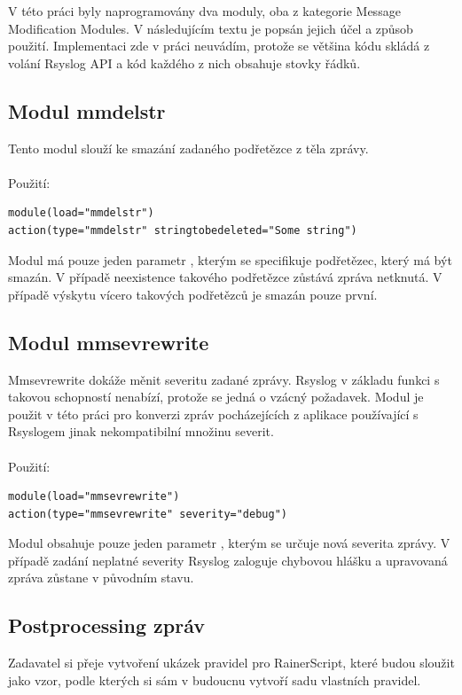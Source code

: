 \documentclass[thesis=B,czech]{FITthesis}[2012/06/26]
\begin{document}
V této práci byly naprogramovány dva moduly, oba z kategorie Message Modification Modules. V následujícím textu je popsán jejich účel a způsob použití. Implementaci zde v práci neuvádím, protože se většina kódu skládá z volání Rsyslog API a kód každého z nich obsahuje stovky řádků.

\subsection{Modul mmdelstr}
Tento modul slouží ke smazání zadaného podřetězce z těla zprávy.
\\
\\
Použití:
\begin{lstlisting}[style=RainerScriptSimpleStyle]
module(load="mmdelstr") 
action(type="mmdelstr" stringtobedeleted="Some string")
\end{lstlisting}

Modul má pouze jeden parametr , kterým se specifikuje podřetězec, který má být smazán. V případě neexistence takového podřetězce zůstává zpráva netknutá. V případě výskytu vícero takových podřetězců je smazán pouze první.

\subsection{Modul mmsevrewrite}
Mmsevrewrite dokáže měnit severitu zadané zprávy. Rsyslog v základu funkci s takovou schopností nenabízí, protože se jedná o vzácný požadavek. Modul je použit v této práci pro konverzi zpráv pocházejících z aplikace používající s Rsyslogem jinak nekompatibilní množinu severit.
\\
\\
Použití:
\begin{lstlisting}[style=RainerScriptSimpleStyle]
module(load="mmsevrewrite")
action(type="mmsevrewrite" severity="debug")
\end{lstlisting}

Modul obsahuje pouze jeden parametr , kterým se určuje nová severita zprávy. V případě zadání neplatné severity Rsyslog zaloguje chybovou hlášku a upravovaná zpráva zůstane v původním stavu.

\subsection{Postprocessing zpráv}
Zadavatel si přeje vytvoření ukázek pravidel pro RainerScript, které budou sloužit jako vzor, podle kterých si sám v budoucnu vytvoří sadu vlastních pravidel.
\end{document}
